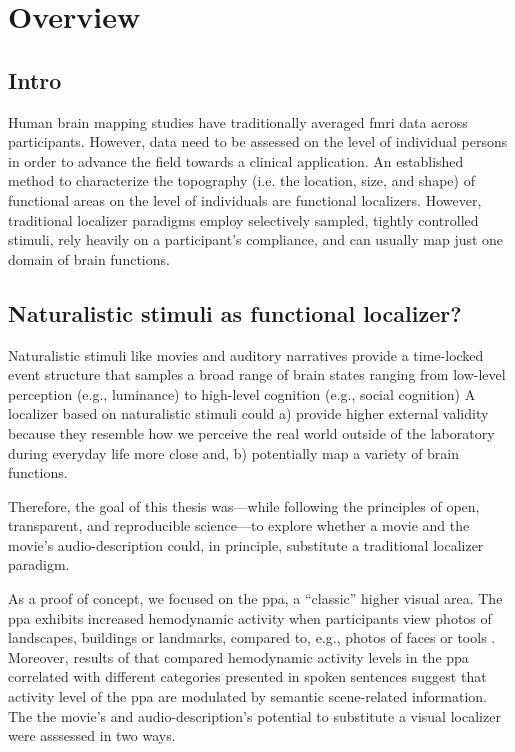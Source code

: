 \section{Overview}


\subsection{Intro}

Human brain mapping studies have traditionally averaged \ac{fmri} data across
participants.
%
However, data need to be assessed on the level of individual persons in order to
advance the field towards a clinical application.
An established method to characterize the topography (i.e. the location, size,
and shape) of functional areas on the level of individuals are functional
localizers.
However, traditional localizer paradigms employ selectively sampled, tightly
controlled stimuli, rely heavily on a participant's compliance, and can usually
map just one domain of brain functions.


\subsection{Naturalistic stimuli as functional localizer?}


Naturalistic stimuli like movies and auditory narratives \citep[cf.][for
reviews]{jaaskelainen2021movies, jaaskelainen2020neural} provide a time-locked
event structure that samples a broad range of brain
states ranging from low-level
perception (e.g., luminance) to high-level cognition (e.g., social cognition)
%
A localizer based on naturalistic stimuli could
%
a) provide higher external validity because they resemble how we perceive
the real world outside of the laboratory during everyday life more close and,
%
b) potentially map a variety of brain functions.

%
Therefore, the goal of this thesis was---while following the principles of open,
transparent, and reproducible science---to explore whether a movie and the
movie's audio-description could, in principle, substitute a traditional
localizer paradigm.

As a proof of concept, we focused on the \ac{ppa}, a ``classic'' higher visual
area.
%
The \ac{ppa} exhibits increased hemodynamic activity when participants view
photos of landscapes, buildings or landmarks, compared to, e.g., photos of faces
or tools \citep[e.g.,][for reviews]{epstein2014neural, aminoff2013role}.
%
Moreover, results of \citep{aziz2008modulation} that compared hemodynamic
activity levels in the \ac{ppa} correlated with different categories
presented in spoken sentences suggest that activity level of the  \ac{ppa}
are modulated by semantic scene-related information.
%
The the movie's and audio-description's potential to substitute a
visual localizer were asssessed in two ways.


